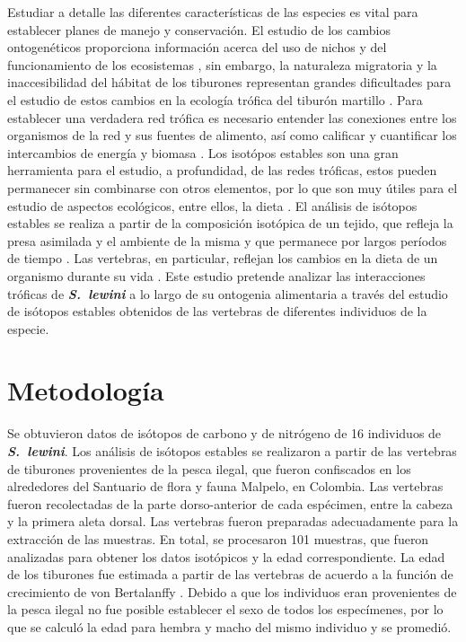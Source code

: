 \documentclass[12pt, letterpaper] {article}
\begin{document}
Estudiar  a detalle las diferentes caracter\'isticas de las especies es vital para establecer planes de manejo y conservaci\'on.  El estudio de los cambios ontogen\'eticos proporciona informaci\'on acerca del uso de nichos y del funcionamiento de los ecosistemas \cite{newsome}, sin embargo, la naturaleza migratoria y la inaccesibilidad del h\'abitat de los tiburones representan grandes dificultades para el estudio de estos cambios en la ecolog\'ia tr\'ofica del tibur\'on martillo \cite{hazen}.  Para establecer una verdadera red tr\'ofica es necesario entender las conexiones entre los organismos de la red y sus fuentes de alimento, as\'i como calificar y cuantificar los intercambios de energ\'ia y biomasa \cite {kling, vander}.  Los isot\'opos estables son una gran herramienta para el estudio, a profundidad, de las redes tr\'oficas, estos pueden permanecer sin combinarse con otros elementos, por lo que son muy \'utiles para el estudio de aspectos ecol\'ogicos, entre ellos, la dieta \cite{zanden}.   El an\'alisis de is\'otopos estables se realiza a partir de la composici\'on isot\'opica de un tejido, que refleja la presa asimilada y el ambiente de la misma y que permanece por largos per\'iodos de tiempo \cite{kim}.  Las vertebras, en particular, reflejan los cambios en la dieta de un organismo durante su vida \cite{koch}.  Este estudio pretende analizar las interacciones tr\'oficas de \textbf{\textit{S.\ lewini}} a lo largo de su ontogenia alimentaria a trav\'es del estudio de is\'otopos estables obtenidos de las vertebras de diferentes individuos de la especie.







\section{Metodolog\'ia}

Se obtuvieron datos de is\'otopos de carbono y de nitr\'ogeno de 16 individuos de  \textbf{\textit{S.\ lewini}}. Los an\'alisis de is\'otopos estables se realizaron a partir de las vertebras de tiburones provenientes de la pesca ilegal, que fueron confiscados en los alrededores del Santuario de flora y fauna Malpelo, en  Colombia. Las vertebras fueron recolectadas de la parte dorso-anterior de cada esp\'ecimen, entre la cabeza y la primera aleta dorsal. Las vertebras fueron preparadas adecuadamente para la extracción de las muestras. En total, se procesaron 101 muestras, que fueron analizadas para obtener los datos isot\'opicos y la edad correspondiente.
La edad de los tiburones fue estimada a partir de las vertebras de acuerdo a la funci\'on de crecimiento de von Bertalanffy \cite{tolentino}. Debido a que los individuos eran provenientes de la pesca ilegal no fue posible establecer el sexo de todos los espec\'imenes, por lo que se calcul\'o la edad para hembra y  macho del mismo individuo y se promedi\'o.
\end{document}
